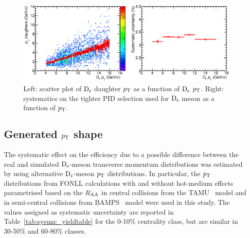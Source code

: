 \begin{figure}[!h]
 \centering
 \includegraphics[angle=0, width=13cm]{./FigCap5/PIDsystDs_MCall.eps}
 \caption{Left: scatter plot of ${\rm D_s}$ daughter $p_{\rm T}$ as a function of ${\rm D_s}$ $p_{\rm T}$. Right: systematics on the tighter PID selection used for ${\rm D_s}$ meson as a function of $p_{\rm T}$.}
 \label{fig:DsPIDsys} 
\end{figure}

\subsection{Generated $p_{\rm T}$ shape}
The systematic effect on the efficiency due to a possible difference between 
the real and simulated ${\rm D_s}$-meson transverse momentum distributions
was estimated by using alternative ${\rm D_s}$-meson $p_{\rm T}$ distributions.
In particular, the $p_{\rm T}$ distributions from FONLL calculations with
and without hot-medium effects parametrised based on the $R_{\rm AA}$ in central collisions from the 
TAMU~\cite{He:2014cla} model and in semi-central collisions from 
BAMPS~\cite{Uphoff:2014hza} model were used in this study.
The values assigned as systematic uncertainty are reported in 
Table~\ref{tab:sysunc_yieldtable} for the 0-10\% centrality class, but are similar in 
30-50\% and 60-80\% classes. 

